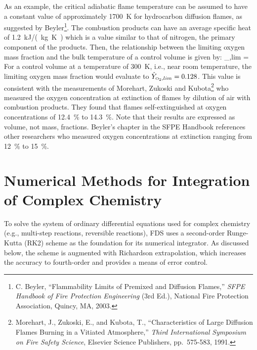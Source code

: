 As an example, the critical adiabatic flame temperature can be assumed to have a constant value of approximately 1700~K for
hydrocarbon diffusion flames, as suggested by Beyler\footnote{C. Beyler, ``Flammability Limits of Premixed and Diffusion Flames,''
{\em SFPE Handbook of Fire Protection Engineering} (3rd Ed.), National Fire Protection Association, Quincy, MA, 2003.}. The
combustion products can have an average specific heat of \SI{1.2}{kJ/(kg.K)} which is a value similar to that of nitrogen, the
primary component of the products. Then, the relationship between the limiting oxygen mass fraction and the bulk temperature of a
control volume is given by:
\be
   _{\OTWO,lim} =  \approx  {} 
\label{extinction_model}
\ee
For a control volume at a temperature of \SI{300}{K}, i.e., near room temperature, the limiting oxygen mass fraction would
evaluate to $\hat{Y}_{\text{\tiny \hbox{O}$_2$},lim}=0.128$.  This value is consistent with the measurements of Morehart, Zukoski and
Kubota\footnote{Morehart, J., Zukoski, E., and Kubota, T., ``Characteristics of Large Diffusion Flames Burning in a Vitiated
Atmosphere,'' {\em Third International Symposium on Fire Safety Science}, Elsevier Science Publishers, pp.~575-583, 1991.} who
measured the oxygen concentration at extinction of flames by dilution of air with combustion products. They found that flames
self-extinguished at oxygen concentrations of 12.4~\% to 14.3~\%. Note that their results are expressed as volume, not mass,
fractions. Beyler's chapter in the SFPE Handbook references other researchers who measured oxygen concentrations at extinction
ranging from 12~\% to 15~\%.

\chapter{Numerical Methods for Integration of Complex Chemistry}
\label{chemistry_integration}

To solve the system of ordinary differential equations used for complex chemistry (e.g., multi-step reactions, reversible
reactions), FDS uses a second-order Runge-Kutta (RK2) scheme as the foundation for its numerical integrator.  As discussed below,
the scheme is augmented with Richardson extrapolation, which increases the accuracy to fourth-order and provides a means of error
control.

